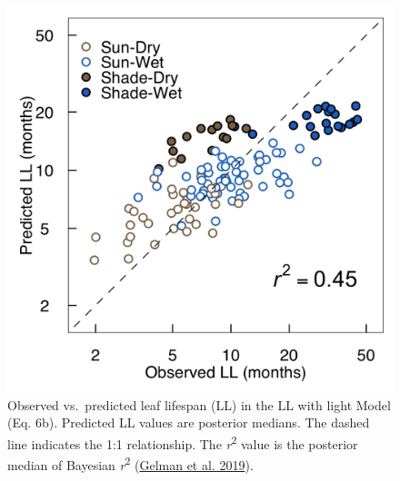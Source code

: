\documentclass[
  12pt,
  a4paper,
,tablecaptionabove
]{scrartcl}
\begin{document}
\begin{figure}
\hypertarget{fig:LLplt}{%
\centering
\includegraphics{../figs/LL_plot2.png}
\caption{Observed vs.~predicted leaf lifespan (LL) in the LL with light Model (Eq. 6b).
Predicted LL values are posterior medians.
The dashed line indicates the 1:1 relationship.
The \emph{r}\textsuperscript{2} value is the posterior median of Bayesian \emph{r}\textsuperscript{2} (\protect\hyperlink{ref-Gelman2019}{Gelman et al. 2019}).}\label{fig:LLplt}
}
\end{figure}

\newpage
\end{document}
